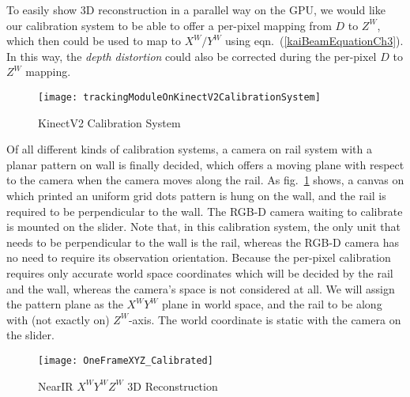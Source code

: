 To easily show 3D reconstruction in a parallel way on the GPU, we would like our calibration system to be able to offer a per-pixel mapping from \(D\) to \(Z^W\), which then could be used to map to \(X^W/Y^W\) using eqn.~(\ref{kaiBeamEquationCh3}). In this way, the \emph{depth distortion} could also be corrected during the per-pixel \(D\) to \(Z^W\) mapping.
%
\begin{figure}[t]
\centering
\texttt{[image: trackingModuleOnKinectV2CalibrationSystem]}
\caption{KinectV2 Calibration System}
\label{trackingModuleOnKinectV2CalibrationSystemCh3}
\end{figure}%
%
Of all different kinds of calibration systems, a camera on rail system with a planar pattern on wall is finally decided, which offers a moving plane with respect to the camera when the camera moves along the rail. As fig.~\ref{trackingModuleOnKinectV2CalibrationSystemCh3} shows, a canvas on which printed an uniform grid dots pattern is hung on the wall, and the rail is required to be perpendicular to the wall. The RGB-D camera waiting to calibrate is mounted on the slider. Note that, in this calibration system, the only unit that needs to be perpendicular to the wall is the rail, whereas the RGB-D camera has no need to require its observation orientation. Because the per-pixel calibration requires only accurate world space coordinates which will be decided by the rail and the wall, whereas the camera's space is not considered at all. We will assign the pattern plane as the \(X^WY^W\) plane in world space, and the rail to be along with (not exactly on) \(Z^W\)-axis. The world coordinate is static with the camera on the slider. %
%
\begin{figure}[!t]
\centering
\texttt{[image: OneFrameXYZ\_Calibrated]}
\caption{NearIR \(X^{W}Y^{W}Z^{W}\) 3D Reconstruction}
\label{OneFrameXYZ_Calibrated}
\end{figure}%
